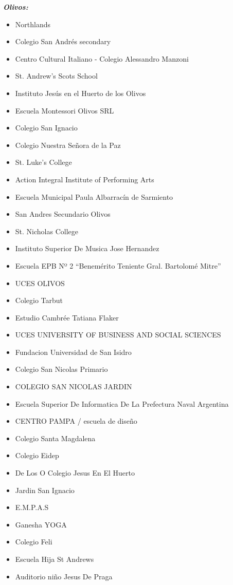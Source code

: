 \documentclass[a4paper, 10pt]{article}
\begin{document}
					\emph{\textbf{Olivos:}}
					\begin{itemize}
					\item Northlands
\item Colegio San Andrés secondary
\item Centro Cultural Italiano - Colegio Alessandro Manzoni
\item St. Andrew's Scots School
\item Instituto Jesús en el Huerto de los Olivos
\item Escuela Montessori Olivos SRL
\item Colegio San Ignacio
\item Colegio Nuestra Señora de la Paz
\item St. Luke's College
\item Action Integral Institute of Performing Arts
\item Escuela Municipal Paula Albarracín de Sarmiento
\item San Andres Secundario Olivos
\item St. Nicholas College
\item Instituto Superior De Musica Jose Hernandez
\item Escuela EPB Nº 2 “Benemérito Teniente Gral. Bartolomé Mitre”
\item UCES OLIVOS
\item Colegio Tarbut
\item Estudio Cambrée Tatiana Flaker
\item UCES UNIVERSITY OF BUSINESS AND SOCIAL SCIENCES
\item Fundacion Universidad de San Isidro
\item Colegio San Nicolas Primario
\item COLEGIO SAN NICOLAS JARDIN
\item Escuela Superior De Informatica De La Prefectura Naval Argentina
\item CENTRO PAMPA / escuela de diseño
\item Colegio Santa Magdalena
\item Colegio Eidep
\item De Los O Colegio Jesus En El Huerto
\item Jardin San Ignacio
\item E.M.P.A.S
\item Ganesha YOGA
\item Colegio Feli
\item Escuela Hija St Andrews
\item Auditorio niño Jesus De Praga

\end{itemize}
\end{document}
